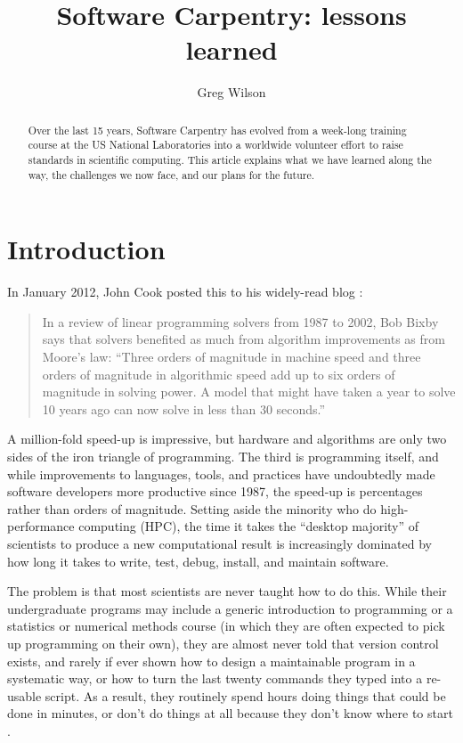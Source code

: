 \documentclass[10pt,a4paper,twocolumn]{article}
\begin{document}

\title{Software Carpentry: lessons learned}
\author[1]{Greg Wilson}

\maketitle
\thispagestyle{fancy}

\begin{abstract}

Over the last 15 years, Software Carpentry has evolved from a week-long
training course at the US National Laboratories into a worldwide
volunteer effort to raise standards in scientific computing. This
article explains what we have learned along the way, the challenges we
now face, and our plans for the future.

\end{abstract}
\clearpage

\section*{Introduction}

In January 2012, John Cook posted this to his widely-read blog
\cite{cook2012}:

\begin{quote}
In a review of linear programming solvers from 1987 to 2002, Bob Bixby
says that solvers benefited as much from algorithm improvements as from
Moore's law: ``Three orders of magnitude in machine speed and three
orders of magnitude in algorithmic speed add up to six orders of
magnitude in solving power. A model that might have taken a year to
solve 10 years ago can now solve in less than 30 seconds.''
\end{quote}

A million-fold speed-up is impressive, but hardware and algorithms are
only two sides of the iron triangle of programming. The third is
programming itself, and while improvements to languages, tools, and
practices have undoubtedly made software developers more productive
since 1987, the speed-up is percentages rather than orders of magnitude.
Setting aside the minority who do high-performance computing (HPC), the
time it takes the ``desktop majority'' of scientists to produce a new
computational result is increasingly dominated by how long it takes to
write, test, debug, install, and maintain software.

The problem is that most scientists are never taught how to do this. While
their undergraduate programs may include a generic introduction to
programming or a statistics or numerical methods course (in which
they are often expected to pick up programming on their own), they are
almost never told that version control exists, and rarely if ever shown
how to design a maintainable program in a systematic way, or how to turn
the last twenty commands they typed into a re-usable script. As a
result, they routinely spend hours doing things that could be done in
minutes, or don't do things at all because they don't know where to
start \cite{hannay2009,prabhu2011}.
\end{document}
